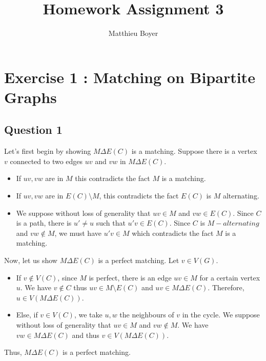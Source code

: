\documentclass{cours}
\title{Homework Assignment 3}
\author{Matthieu Boyer}
\date{}
\begin{document}
\section{Exercise 1 : Matching on Bipartite Graphs}
\subsection{Question 1}
Let's first begin by showing $M\Delta E(C)$ is a matching. Suppose there is a vertex $v$ connected to two edges $uv$ and $vw$ in $M\Delta E(C)$.
\begin{itemize}
    \item If $uv, vw$ are in $M$ this contradicts the fact $M$ is a matching. 
    \item If $uv, vw$ are in $E(C) \setminus M$, this contradicts the fact $E(C)$ is $M$ alternating. 
    \item We suppose without loss of generality that $uv \in M$ and $vw \in E(C)$. Since $C$ is a path, there is $u' \neq u$ such that $u'v \in E(C)$. Since $C$ is $M-alternating$ and $vw \notin M$, we must have $u'v \in M$ which contradicts the fact $M$ is a matching.
\end{itemize}
Now, let us show $M\Delta E(C)$ is a perfect matching. Let $v \in V(G)$.
\begin{itemize}
    \item If $v \notin V(C)$, since $M$ is perfect, there is an edge $uv \in M$ for a certain vertex $u$. We have $v \notin C$ thus $uv \in M\setminus E(C)$ and $uv \in M\Delta E(C)$. Therefore, $u \in V(M\Delta E(C))$.
    \item Else, if $v \in V(C)$, we take $u, w$ the neighbours of $v$ in the cycle. We suppose without loss of generality that $uv \in M$ and $vw \notin M$. We have $vw \in M\Delta E(C)$ and thus $v \in V(M \Delta E(C))$.
\end{itemize}
Thus, $M\Delta E(C)$ is a perfect matching. 
\end{document}
